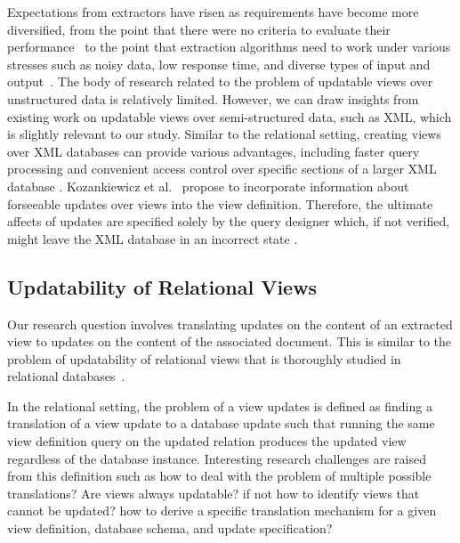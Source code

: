 Expectations from extractors have risen as requirements have become more diversified, from the point that there were no  criteria to evaluate their performance~\cite{gaizauskas1998information} to the point that extraction algorithms need to work under various stresses such as noisy data, low response time, and diverse types of input and output~\cite{DBLP:journals/ftdb/Sarawagi08}. The body of research related to the problem of updatable views over unstructured data is relatively limited. However, we can draw insights from existing work on updatable views over semi-structured data, such as XML, which is slightly relevant to our study. Similar to the relational setting, creating views over XML databases can provide various advantages, including faster query processing and convenient access control over specific sections of a larger XML database \cite{DBLP:conf/vldb/AbiteboulMRVW98}. Kozankiewicz et al.~\cite{DBLP:conf/adbis/KozankiewiczLS03} propose to incorporate  information about forseeable updates over views into the  view definition. Therefore,  the ultimate affects of updates are specified solely by the query designer which, if not verified, might leave the XML database in an incorrect state .  
\subsection{Updatability of Relational Views}
Our research question involves translating updates on  the content of an extracted view to updates on the content of the associated  document. This is similar to the problem of updatability of relational views that is thoroughly studied in relational databases~\cite{DBLP:books/sp/kimrb85/FurtadoC85, DBLP:journals/is/FurtadoSS79,DBLP:journals/computer/Keller86,DBLP:journals/algorithmica/MedeirosT86, DBLP:journals/pvldb/MeliouGS11}. 

In the relational setting, the problem of a view updates is defined as finding a translation of a view update   to a database update  such that running the same view definition query on the updated relation produces the updated view regardless of the database instance. Interesting research  challenges are raised from this definition such as how to deal with the problem of multiple possible translations? Are views always updatable? if not how to identify views that cannot be updated? how to derive a specific translation mechanism for a given view definition, database schema, and update specification? 


